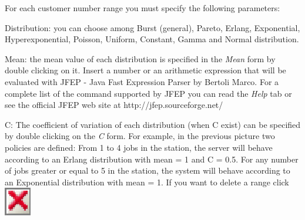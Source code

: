 For each customer number range you must specify the following parameters:
\begin{description*}
\item [Distribution:] you can choose among Burst (general),
Pareto, Erlang, Exponential, Hyperexponential, Poisson, Uniform,
Constant, Gamma and Normal distribution. \item [Mean:] the mean
value of each distribution is specified in the \emph{Mean} form by
double clicking on it. Insert a number or an arithmetic expression
that will be evaluated with JFEP - Java Fast Expression Parser by
Bertoli Marco. For a complete list of the command supported by
JFEP you can read the \emph{Help} tab or see the official JFEP web
site at http://jfep.sourceforge.net/ \item [C:] The coefficient of
variation of each distribution (when C exist) can be specified by
double clicking on the \emph{C} form. For example, in the previous
picture two policies are defined: From 1 to 4 jobs in the station,
the server will behave according to an Erlang distribution with
mean = 1 and C = 0.5. For any number of jobs greater or equal to 5
in the station, the system will behave according to an Exponential
distribution with mean = 1. If you want to delete a range click
\includegraphics[scale=.5]{img/jsim/delete.eps}
\end{description*}

